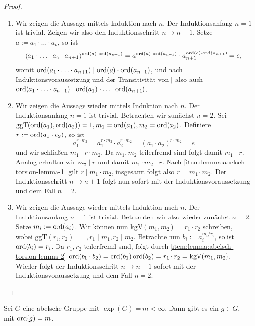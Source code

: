 \begin{proof}{\ }
    \begin{enumerate}
        \item Wir zeigen die Aussage mittels Induktion nach $n$. Der Induktionsanfang $n=1$ ist trivial. Zeigen wir also den Induktionsschritt $n \to n + 1$. Setze $a := a_1 \cdot \hdots \cdot a_n$, so ist
        $$ (a_1 \cdot \hdots \cdot a_n \cdot a_{n+1})^{\operatorname{ord}(a) \cdot \operatorname{ord}(a_{n+1})} = a^{\operatorname{ord}(a) \cdot \operatorname{ord}(a_{n+1})} \cdot a_{n+1}^{\operatorname{ord}(a) \cdot \operatorname{ord}(a_{n+1})} = e, $$
        womit $\operatorname{ord}(a_1 \cdot \hdots \cdot a_{n+1}) \mid \operatorname{ord}(a) \cdot \operatorname{ord}(a_{n+1})$, und nach Induktionsvoraussetzung und der Transitivität von $\mid$ also auch $\operatorname{ord}(a_1 \cdot \hdots \cdot a_{n+1}) \mid \operatorname{ord}(a_1) \cdot \hdots \cdot \operatorname{ord}(a_{n+1})$.

        \item Wir zeigen die Aussage wieder mittels Induktion nach $n$. Der Induktionsanfang $n=1$ ist trivial. Betrachten wir zunächst $n=2$. Sei $\mathrm{ggT}(\operatorname{ord}(a_1), \operatorname{ord}(a_2)) = 1, m_1 = \operatorname{ord}(a_1), m_2 = \operatorname{ord}(a_2)$. Definiere $r := \operatorname{ord}(a_1 \cdot a_2)$, so ist
        $$ a_1^{r \cdot m_2} = a_1^{r \cdot m_2} \cdot a_2^{r \cdot m_2} = (a_1 \cdot a_2)^{r \cdot m_2} = e $$
        und wir schließen $m_1 \mid r \cdot m_2$. Da $m_1, m_2$ teilerfremd sind folgt damit $m_1 \mid r$. Analog erhalten wir $m_2 \mid r$ und damit $m_1 \cdot m_2 \mid r$. Nach \ref*{item:lemma:abelsch-torsion-lemma-1} gilt $r \mid m_1 \cdot m_2$, insgesamt folgt also $r = m_1 \cdot m_2$. Der Induktionsschritt $n \to n+1$ folgt nun sofort mit der Induktionsvoraussetzung und dem Fall $n=2$.

        \item Wir zeigen die Aussage wieder mittels Induktion nach $n$. Der Induktionsanfang $n=1$ ist trivial. Betrachten wir also wieder zunächst $n=2$. Setze $m_i := \operatorname{ord}(a_i)$. Wir können nun $\mathrm{kgV}(m_1, m_2) = r_1 \cdot r_2$ schreiben, wobei $\mathrm{ggT}(r_1, r_2) = 1, r_1 \mid m_1, r_2 \mid m_2$. Betrachte nun $b_i := a_i^{m_i / r_i}$, so ist $\operatorname{ord}(b_i) = r_i$. Da $r_1, r_2$ teilerfremd sind, folgt durch \ref*{item:lemma:abelsch-torsion-lemma-2} $\operatorname{ord}(b_1 \cdot b_2) = \operatorname{ord}(b_1) \operatorname{ord}(b_2) = r_1 \cdot r_2 = \mathrm{kgV}(m_1, m_2)$. Wieder folgt der Induktionsschritt $n \to n+1$ sofort mit der Induktionsvoraussetzung und dem Fall $n=2$. 
    \end{enumerate}
\end{proof}

\begin{corollary}
    Sei $G$ eine abelsche Gruppe mit $\exp(G) = m < \infty$. Dann gibt es ein $g \in G$, mit $\operatorname{ord}(g) = m$.
\end{corollary}

